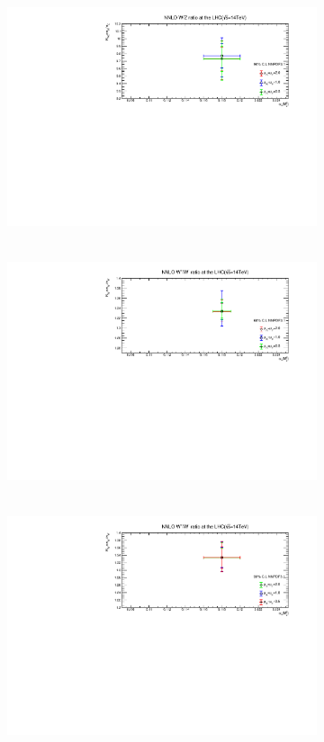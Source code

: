 \begin{figure}[H]
\begin{subfigure}{0.49\textwidth}
\vspace*{-8mm}
\caption{}
\label{rwz14rf}
\end{subfigure}
\begin{subfigure}{0.49\textwidth}
\includegraphics[height=7cm, width=\textwidth]{chapter4/Rwz14RF_90.pdf}
\vspace*{-8mm}
\caption{}
\label{rwz14rf1}
\end{subfigure}
\begin{subfigure}{0.49\textwidth}
\includegraphics[height=7cm, width=\textwidth]{chapter4/Rww14RF_68.pdf}
\vspace*{-8mm}
\caption{}
\label{rww14rf}
\end{subfigure}
\begin{subfigure}{0.49\textwidth}
\includegraphics[height=7cm, width=\textwidth]{chapter4/Rww14RF_90.pdf}

\end{subfigure}
\end{figure}
